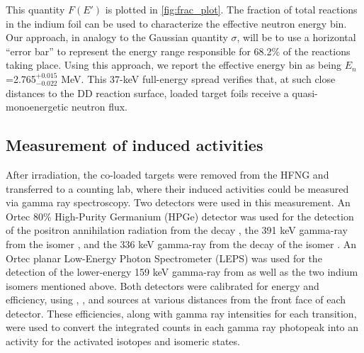 \documentclass[5p]{elsarticle}
\newcommand{\pp}[1]{\left( #1\right)}
\newcommand{\comment}[1]{\todo[color=blue!20!white,inline]{ASV: #1}}
\begin{document}


This quantity $F\pp{E'}$ is plotted in \autoref{fig:frac_plot}.
The fraction of total reactions in the indium foil can be used to characterize the effective neutron energy bin.
 Our approach, in analogy to the Gaussian quantity $\sigma$, will be to use a horizontal \enquote{error bar}  to represent the energy range responsible for 68.2\% of the reactions taking place.
 Using this approach, we report the effective energy bin as being $E_n$=2.765$^{+0.015}_{-0.022}$ MeV.
This 37-keV full-energy spread verifies that, at such close distances to the DD reaction surface, loaded target foils receive a quasi-monoenergetic neutron flux.
 

 






\subsection{Measurement of induced activities}\label{sec:spectroscopy}

After irradiation, the co-loaded targets were removed from the HFNG and transferred to a counting lab, where their induced activities could be measured via gamma ray spectroscopy.
Two detectors were used in this measurement.
An Ortec 80\% High-Purity Germanium (HPGe) detector was used for the detection of the positron annihilation radiation from the   decay \cite{Singh2007}, the 391 keV gamma-ray from the   isomer \cite{Blachot2010a}, and the 336 keV gamma-ray from the decay of the   isomer \cite{Blachot2012}.
An Ortec planar Low-Energy Photon Spectrometer (LEPS)  was used for the detection of the lower-energy 159 keV gamma-ray from  \cite{Burrows2007} as well as the two indium isomers mentioned above.
Both detectors were calibrated for energy and efficiency, using , , and  sources at various distances from the front face of each detector.
These efficiencies, along with gamma ray intensities for each transition, were used to convert the integrated counts in each gamma ray photopeak into an activity for the activated isotopes and isomeric states.
\end{document}
